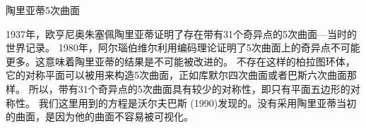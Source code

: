 ﻿\begin{surferPage}{陶里亚蒂5次曲面}
    
 1937年，欧亨尼奥朱塞佩陶里亚蒂证明了存在带有31个奇异点的5次曲面---当时的世界记录。
1980年，阿尔瑙伯维尔利用编码理论证明了5次曲面上的奇异点不可能更多。这意味着陶里亚蒂的结果是不可能被改进的。
不存在这样的柏拉图环体，它的对称平面可以被用来构造5次曲面，正如库默尔四次曲面或者巴斯六次曲面那样。 所以，带有31个奇异点的5次曲面具有较少的对称性，即只有平面五边形的对称性。
我们这里用到的方程是沃尔夫巴斯 (1990)发现的。没有采用陶里亚蒂当初的曲面，是因为他的曲面不容易被可视化。
 
\end{surferPage}

